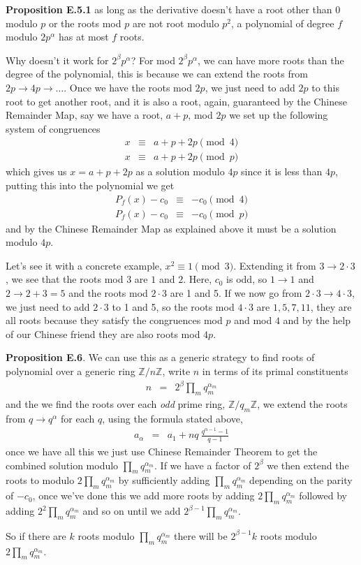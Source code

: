 \documentclass[aps,preprint,preprintnumbers,nofootinbib,showpacs,prd]{revtex4-1}
\newcommand{\nbea}{\begin{eqnarray*}}
\newcommand{\neea}{\end{eqnarray*}}
\begin{document}
{\bf Proposition E.5.1} as long as the derivative doesn't have a root other than 0 modulo $p$ or the roots mod $p$ are not root modulo $p^2$, a polynomial of degree $f$ modulo $2p^\alpha$ has at most $f$ roots.

Why doesn't it work for $2^\beta p^\alpha$? For mod $2^\beta p^\alpha$, we can have more roots than the degree of the polynomial, this is because we can extend the roots from $2p \to 4p \to \dots$. Once we have the roots mod $2p$, we just need to add $2p$ to this root to get another root, and it is also a root, again, guaranteed by the Chinese Remainder Map, say we have a root, $a + p$, mod $2p$ we set up the following system of congruences
%
\nbea
x & \equiv & a + p + 2p \pmod{4} \\
x & \equiv & a + p + 2p \pmod{p}
\neea
%
which gives us $x = a + p + 2p$ as a solution modulo $4p$ since it is less than $4p$, putting this into the polynomial we get
%
\nbea
P_f(x) - c_0 & \equiv & -c_0 \pmod{4} \\
P_f(x) - c_0 & \equiv & -c_0 \pmod{p}
\neea
%
and by the Chinese Remainder Map as explained above it must be a solution modulo $4p$.

Let's see it with a concrete example, $x^2 \equiv 1 \pmod{3}$. Extending it from $3 \to 2\cdot 3$, we see that the roots mod 3 are $1$ and $2$. Here, $c_0$ is odd, so $1 \to 1$ and $2 \to 2+3 = 5$ and the roots mod $2\cdot 3$ are 1 and 5. If we now go from $2\cdot 3 \to 4\cdot 3$, we just need to add $2\cdot 3$ to 1 and 5, so the roots mod $4\cdot 3$ are $1, 5, 7, 11$, they are all roots because they satisfy the congruences mod $p$ and mod $4$ and by the help of our Chinese friend they are also roots mod $4p$.

{\bf Proposition E.6}. We can use this as a generic strategy to find roots of polynomial over a generic ring $\mathbb{Z}/n\mathbb{Z}$, write $n$ in terms of its primal constituents 
%
\nbea
n & = & 2^\beta \prod_m q_m^{\alpha_m}
\neea
%
and the we find the roots over each {\it odd} prime ring, $\mathbb{Z}/q_m\mathbb{Z}$, we extend the roots from $q \to q^{\alpha}$ for each $q$, using the formula stated above,
%
\nbea
a_\alpha & = & a_1 + nq ~ \frac{q^{\alpha-1} - 1}{q-1}
\neea
%
once we have all this we just use Chinese Remainder Theorem to get the combined solution modulo $\prod_m q_m^{\alpha_m}$. If we have a factor of $2^\beta$ we then extend the roots to modulo $2\prod_m q_m^{\alpha_m}$ by sufficiently adding $\prod_m q_m^{\alpha_m}$ depending on the parity of $-c_0$, once we've done this we add more roots by adding $2\prod_m q_m^{\alpha_m}$ followed by adding $2^2\prod_m q_m^{\alpha_m}$ and so on until we add $2^{\beta-1}\prod_m q_m^{\alpha_m}$.

So if there are $k$ roots modulo $\prod_m q_m^{\alpha_m}$ there will be $2^{\beta-1} k$ roots modulo $2\prod_m q_m^{\alpha_m}$.
\end{document}

